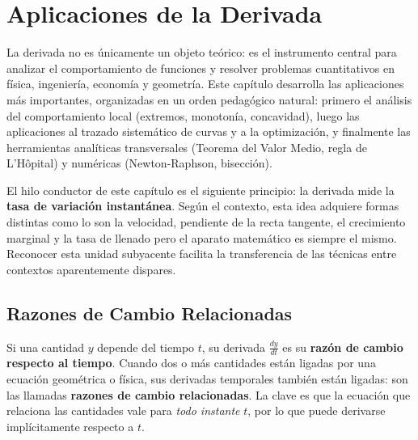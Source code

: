 \chapter{Aplicaciones de la Derivada}

La derivada no es únicamente un objeto teórico: es el instrumento
central para analizar el comportamiento de funciones y resolver
problemas cuantitativos en física, ingeniería, economía y geometría.
Este capítulo desarrolla las aplicaciones más importantes, organizadas
en un orden pedagógico natural: primero el análisis del comportamiento
local (extremos, monotonía, concavidad), luego las aplicaciones al
trazado sistemático de curvas y a la optimización, y finalmente las
herramientas analíticas transversales (Teorema del Valor Medio, regla
de L'Hôpital) y numéricas (Newton-Raphson, bisección).

\begin{rem}
El hilo conductor de este capítulo es el siguiente principio: la
derivada mide la \textbf{tasa de variación instantánea}. Según el
contexto, esta idea adquiere formas distintas como lo son la velocidad, pendiente de la recta tangente, el
crecimiento marginal y la tasa de llenado pero el aparato matemático
es siempre el mismo. Reconocer esta unidad subyacente facilita la
transferencia de las técnicas entre contextos aparentemente dispares.
\end{rem}

\section{Razones de Cambio Relacionadas}

Si una cantidad $y$ depende del tiempo $t$, su derivada $\frac{dy}{dt}$
es su \textbf{razón de cambio respecto al tiempo}. Cuando dos o más
cantidades están ligadas por una ecuación geométrica o física, sus
derivadas temporales también están ligadas: son las llamadas
\textbf{razones de cambio relacionadas}. La clave es que la ecuación
que relaciona las cantidades vale para \emph{todo instante} $t$, por
lo que puede derivarse implícitamente respecto a $t$.


